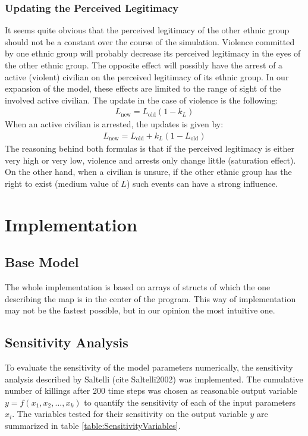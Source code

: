 \documentclass[11pt]{article}
\begin{document}
\subsubsection{Updating the Perceived Legitimacy}
It seems quite obvious that the perceived legitimacy of the other ethnic group should not be a constant over the course of the simulation. Violence committed by one ethnic group will probably decrease its perceived legitimacy in the eyes of the other ethnic group. The opposite effect will possibly have the arrest of a active (violent) civilian on the perceived legitimacy of its ethnic group. In our expansion of the model, these effects are limited to the range of sight of the involved active civilian. The update in the case of violence is the following:
\begin{align}
L_{\text{new}} = L_{\text{old}} \left( 1 - k_L \right)
\end{align}
When an active civilian is arrested, the updates is given by:
\begin{align}
L_{\text{new}} = L_{\text{old}} + k_L \left( 1 - L_{\text{old}} \right)
\end{align}
The reasoning behind both formulas is that if the perceived legitimacy is either very high or very low, violence and arrests only change little (saturation effect). On the other hand, when a civilian is unsure, if the other ethnic group has the right to exist (medium value of $L$) such events can have a strong influence.

\section{Implementation}

\subsection{Base Model}
The whole implementation is based on arrays of structs of which the one describing the map is in the center of the program. This way of implementation may not be the fastest possible, but in our opinion the most intuitive one.

\subsection{Sensitivity Analysis}
To evaluate the sensitivity of the model parameters numerically, the sensitivity analysis described by Saltelli (cite Saltelli2002) was implemented. The cumulative number of killings after 200 time steps was chosen as reasonable output variable $y = f(x_1,x_2,...,x_k)$ to quantify the sensitivity of each of the input parameters $x_i$.
The variables tested for their sensitivity on the output variable $y$ are summarized in table \ref{table:SensitivityVariables}. 
\end{document}
